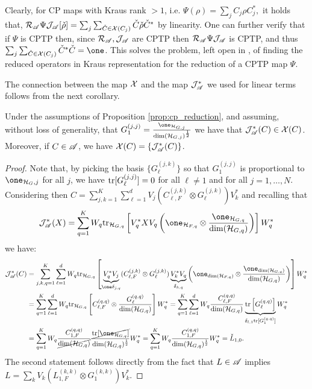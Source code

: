 \documentclass[aihp,12pt]{imsart}
\begin{document}
Clearly, for CP maps with Kraus rank $>1$, i.e. $\Psi(\rho) = \sum_j C_j\rho C_j^*,$ it holds that,  $\mathcal{R}_{\mathscr{A}} \Psi \mathcal{J}_{\mathscr{A}}[\check{\rho}] = \sum_j \sum_{\check{C}\in\mathcal{X}(C_j)} \check{C} \check{\rho} \check{C}^*$ by linearity. One can further verify that if $\Psi$ is CPTP then, since $\mathcal{R}_{\mathscr{A}},\mathcal{J}_{\mathscr{A}}$ are CPTP then $\mathcal{R}_{\mathscr{A}} \Psi \mathcal{J}_{\mathscr{A}}$ is CPTP, and thus $\sum_j \sum_{\check{C}\in\Xc(C_j)} \check{C}^*\check{C} = \one$. This solves the problem, left open in \cite{tit2023}, of finding the reduced operators in Kraus representation for the reduction of a CPTP map $\Psi$.

The connection between the map $\mathcal{X}$ and the map $\mathcal{J}_{\mathscr{A}}^*$ we used for linear terms follows from the next corollary.
\begin{corollary}
\label{cor:reduced_operators}
    Under the assumptions of Proposition \ref{prop:cp_reduction}, and assuming, without loss of generality, that $G_{1}^{(j,j)} = \frac{\one_{\Hc_{G,j}}}{\dim(\Hc_{G,j})^\um}$ we have that $\mathcal{J}_{\mathscr{A}}^*(C)\in\mathcal{X}(C)$. Moreover, if $C\in\mathscr{A}$, we have $\mathcal{X}(C) = \{\mathcal{J}_{\mathscr{A}}^*(C)\}$.
\end{corollary}
\begin{proof}
Note that, by picking the basis $\{G_\ell^{(j,k)}\}$ so that $G_1^{(j,j)}$ is proportional to $\one_{\Hc_G,j}$ for all $j$, we have ${\rm tr}[G_\ell^{(j,j)}] = 0$ for all $\ell\neq1$ and for all $j=1,\dots,N$. Considering then $C =\sum_{j,k=1}^K\sum_{\ell=1}^d V_j (C_{\ell,F}^{(j,k)}\otimes G_{\ell}^{(j,k)}) V_k^*$ and recalling that \[\Jc_\As^*(X) = \sum_{q=1}^K W_q \tr_{\Hc_{G,q}}\left[V_q^* X V_q \left(\one_{\Hc_{F,q}}\otimes\frac{\one_{\Hc_{G,q}}}{\dim(\Hc_{G,q})}\right) \right]W_q^*\] we have:
\begin{align*}
    \Jc_\As^*(C) &= \sum_{j,k,q=1}^K \sum_{\ell=1}^d W_q \tr_{\Hc_{G,q}}\left[\underbrace{V_q^* V_j}_{\one\delta_{j,q}} (C_{\ell,F}^{(j,k)}\otimes G_{\ell}^{(j,k)}) \underbrace{V_k^* V_q}_{\delta_{k,q}} \left(\one_{\dim(\Hc_{F,q})}\otimes\frac{\one_{\dim(\Hc_{G,q})}}{\dim(\Hc_{G,q})}\right) \right]W_q^*\\
    &= \sum_{q=1}^K \sum_{\ell=1}^d W_q \tr_{\Hc_{G,q}}\left[C_{\ell,F}^{(q,q)} \otimes\frac{G_{\ell}^{(q,q)}}{\dim(\Hc_{G,q})} \right]W_q^*
    = \sum_{q=1}^K \sum_{\ell=1}^d W_q \frac{C_{\ell,F}^{(q,q)}} {\dim(\Hc_{G,q})}\underbrace{{\tr\left[G_{\ell}^{(q,q)}\right]}}_{\delta_{l,1} \tr[G_1^{(q,q)}]} W_q^*\\ 
    &= \sum_{q=1}^K W_q \frac{C_{1,F}^{(q,q)}}{\cancel{\dim(\Hc_{G,q})}} \frac{\cancel{\tr[\one_{\Hc_{G,q}}]}}{\dim(\Hc_{G,q})^\um} W_q^*
    = \sum_{q=1}^K W_q \frac{C_{1,F}^{(q,q)}}{\dim(\Hc_{G,q})^\um} W_q^* = \check{L}_{1,0}.
\end{align*}
The second statement follows directly from the fact that $L\in\mathscr{A}$ implies \(L =\sum_{k} V_k (L_{1,F}^{(k,k)}\otimes G_{1}^{(k,k)}) V_k^*.\)
\end{proof}
\end{document}
